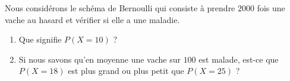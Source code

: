 
\begin{exercice}\label{exoPremiere-0077}

    Nous considérons le schéma de Bernoulli qui consiste à prendre \( 2000\) fois une vache au hasard et vérifier si elle a une maladie. 
    \begin{enumerate}
        \item
            Que signifie \( P(X=10)\) ?
        \item
            Si nous savons qu'en moyenne une vache sur \( 100\) est malade, est-ce que \( P(X=18)\) est plus grand ou plus petit que \( P(X=25)\) ?
    \end{enumerate}

\end{exercice}
